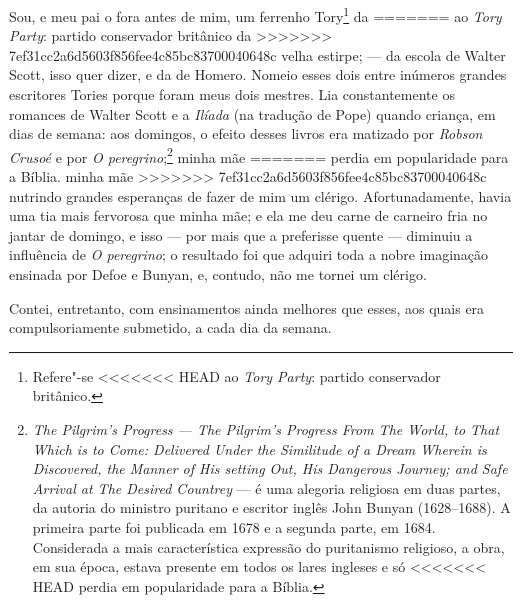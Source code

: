

 Sou, e meu pai o fora antes de mim, um ferrenho Tory\footnote{Refere"-se
<<<<<<< HEAD
  ao \textit{Tory Party}: partido conservador britânico.} da
=======
  ao \textit{Tory Party}: partido conservador britânico  da
>>>>>>> 7ef31cc2a6d5603f856fee4c85bc83700040648c
velha estirpe; --- da escola de Walter Scott, isso quer dizer, e da de
Homero. Nomeio esses dois entre inúmeros grandes escritores Tories
porque foram meus dois mestres. Lia constantemente os romances de Walter
Scott e a \textit{Ilíada} (na tradução de Pope) quando criança, em dias de
semana: aos domingos, o efeito desses livros era matizado por
\textit{Robson Crusoé} e por \textit{O peregrino};\footnote{\textit{The \label{peregrino}
  Pilgrim's Progress --- The Pilgrim's Progress From The World, to That
  Which is to Come: Delivered Under the Similitude of a Dream Wherein is
  Discovered, the Manner of His setting Out, His Dangerous Journey; and
  Safe Arrival at The Desired Countrey} --- é uma alegoria religiosa em
  duas partes, da autoria do ministro puritano e escritor inglês John
  Bunyan (1628--1688). A primeira parte foi publicada em 1678 e a segunda parte, em 1684. Considerada a mais característica expressão do puritanismo religioso,
  a obra, em sua época, estava presente em todos os lares ingleses e só
<<<<<<< HEAD
  perdia em popularidade para a Bíblia.} minha mãe
=======
  perdia em popularidade para a Bíblia.  minha mãe
>>>>>>> 7ef31cc2a6d5603f856fee4c85bc83700040648c
nutrindo grandes esperanças de fazer de mim um clérigo. Afortunadamente,
havia uma tia mais fervorosa que minha mãe; e ela me deu carne de
carneiro fria no jantar de domingo, e isso --- por mais que a preferisse
quente --- diminuiu a influência de \textit{O peregrino}; o resultado foi
que adquiri toda a nobre imaginação ensinada por Defoe e Bunyan, e,
contudo, não me tornei um clérigo.

Contei, entretanto, com ensinamentos ainda melhores que esses, aos
quais era compulsoriamente submetido, a cada dia da semana.

